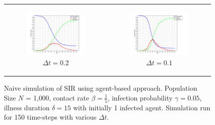 \begin{figure}
\begin{center}
\begin{tabular}{c c}
    	\\
    	
		\begin{subfigure}[b]{0.3\textwidth}
			\centering
			\includegraphics[width=1\textwidth, angle=0]{./shared/fig/frabs/SIR_1000agents_150t_02dt_NOSS_parallel.png}
			\caption{$\Delta t = 0.2$}
			\label{fig:sir_abs_approximating_02dt}
		\end{subfigure}
		& 
		\begin{subfigure}[b]{0.3\textwidth}
			\centering
			\includegraphics[width=1\textwidth, angle=0]{./shared/fig/frabs/SIR_1000agents_150t_01dt_NOSS_parallel.png}
			\caption{$\Delta t = 0.1$}
			\label{fig:sir_abs_approximating_01dt}
		\end{subfigure}
	\end{tabular}
	
	\caption{Naive simulation of SIR using agent-based approach. Population Size $N$ = 1,000, contact rate $\beta = \frac{1}{5}$, infection probability $\gamma = 0.05$, illness duration $\delta = 15$ with initially 1 infected agent. Simulation run for 150 time-steps with various $\Delta t$.} 
	\label{fig:sir_abs_dynamics_naive}
\end{center}
\end{figure}

